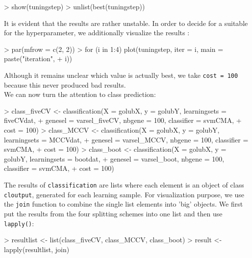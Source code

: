 \begin{Schunk}
\begin{Sinput}
> show(tuningstep)
> unlist(best(tuningstep))
\end{Sinput}
\end{Schunk}

It is evident that the results are rather unstable. In order to decide for
a suitable for the hyperparameter, we additionally visualize the results : 


\begin{Schunk}
\begin{Sinput}
> par(mfrow = c(2, 2))
> for (i in 1:4) plot(tuningstep, iter = i, main = paste("iteration", 
+     i))
\end{Sinput}
\end{Schunk}

Although it remains unclear which value is actually best, we take \texttt{cost
  = 100} because this never produced bad results.\\
We can now  turn the attention to class prediction:

\begin{Schunk}
\begin{Sinput}
> class_fiveCV <- classification(X = golubX, y = golubY, learningsets = fiveCVdat, 
+     genesel = varsel_fiveCV, nbgene = 100, classifier = svmCMA, 
+     cost = 100)
> class_MCCV <- classification(X = golubX, y = golubY, learningsets = MCCVdat, 
+     genesel = varsel_MCCV, nbgene = 100, classifier = svmCMA, 
+     cost = 100)
> class_boot <- classification(X = golubX, y = golubY, learningsets = bootdat, 
+     genesel = varsel_boot, nbgene = 100, classifier = svmCMA, 
+     cost = 100)
\end{Sinput}
\end{Schunk}

The results of \texttt{classification} are lists where each element is an
object of class \texttt{cloutput}, generated for each learning sample. For
visualization purpose, we use the \texttt{join} function to combine the single
list elements into 'big' objects. We first put the results from the
four splitting schemes into one list and then use \texttt{lapply()}:

\begin{Schunk}
\begin{Sinput}
> resultlist <- list(class_fiveCV, class_MCCV, class_boot)
> result <- lapply(resultlist, join)
\end{Sinput}
\end{Schunk}

